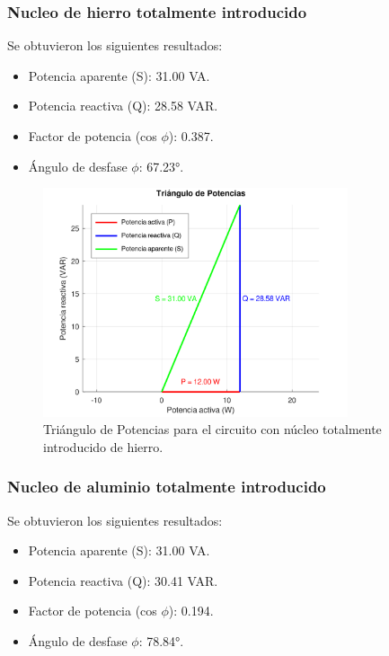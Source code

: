 \documentclass{article}
\begin{document}
        \subsubsection{Nucleo de hierro totalmente introducido}

            Se obtuvieron los siguientes resultados:
            \begin{itemize}
                \item Potencia aparente (S): 31.00 VA.
                \item Potencia reactiva (Q): 28.58 VAR.
                \item Factor de potencia (cos $\phi$): 0.387.
                \item Ángulo de desfase $\phi$: 67.23°.
            \end{itemize}

            \begin{figure}[H]
                \centering
                \includegraphics[width=0.8\textwidth]{graficoTotalHierro.png}
                \caption{Triángulo de Potencias para el circuito con núcleo totalmente introducido de hierro.}
                \label{fig:graficoTotalHierro}
            \end{figure}


        \subsubsection{Nucleo de aluminio totalmente introducido}

                 Se obtuvieron los siguientes resultados:
            \begin{itemize}
                \item Potencia aparente (S): 31.00 VA.
                \item Potencia reactiva (Q): 30.41 VAR.
                \item Factor de potencia (cos $\phi$): 0.194.
                \item Ángulo de desfase $\phi$: 78.84°.
            \end{itemize}
\end{document}
